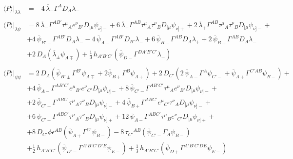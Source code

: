 \documentclass[a4paper,10pt,openany]{article}
\begin{document}
\begin{subequations}
	\begin{align}
		\langle P\rangle \bigg\vert_{\lambda\lambda}&=-4\,\overline{\lambda}_{-}\Gamma^{A}D_{A}\lambda_{-}\\
		\nonumber\\
		\langle P\rangle\bigg\vert_{\lambda\psi}&=8\,\overline{\lambda}_{-}\Gamma^{AB'}\tau^{\mu}{}_{A}e^{\nu}{}_{B'}D_{[\mu}\psi_{\nu ]-}
		+6\,\overline{\lambda}_{-}\Gamma^{AB}\tau^{\mu}{}_{A}\tau^{\nu}{}_{B}D_{[\mu}\psi_{\nu] +}+2\,\overline{\lambda}_{+}\Gamma^{AB}\tau^{\mu}{}_{A}\tau^{\nu}{}_{B}D_{[\mu}\psi_{\nu] -}+\nonumber\\
		&+4\,\overline{\psi}_{B'-}\Gamma^{AB'}D_{A}\lambda_{-}-4\,\overline{\psi}_{A-}\Gamma^{AB'}D_{B'}\lambda_{-}+6\,\overline{\psi}_{B-}\Gamma^{AB}D_{A}\lambda_{+}
		+2\,\overline{\psi}_{B+}\Gamma^{AB}D_{A}\lambda_{-}\nonumber\\
		&+2\,D_{A}(\overline{\lambda}_{\pm}\psi_{A\mp})+\frac{1}{3}\,h_{A'B'C'}(\overline{\psi}_{D-}\Gamma^{DA'B'C'}\lambda_{-})\\
		\nonumber\\
		\langle P\rangle\bigg\vert_{\psi\psi}&=2\,D_{A}(\overline{\psi}_{B'\pm}\Gamma^{B'}\psi_{A\mp}+2\overline{\psi}_{B+}\Gamma^{B}\psi_{A+})+2\,D_{C'}(2\,\overline{\psi}_{A-}\Gamma^{A}\psi_{C'-}+\overline{\psi}_{A+}\Gamma^{C'AB}\psi_{B-})+\nonumber\\
		&+4\,\overline{\psi}_{A-}\Gamma^{AB'C'}e^{\mu}{}_{B'}e^{\nu}{}_{C'}D_{[\mu}\psi_{\nu]-}+8\,\overline{\psi}_{C'-}\Gamma^{AB'C'}\tau^{\mu}{}_{A}e^{\nu}{}_{B'}D_{[\mu}\psi_{\nu]-}+\nonumber\\
		&+2\,\overline{\psi}_{C'+}\Gamma^{ABC'}\tau^{\mu}{}_{A}\tau^{\nu}{}_{B}D_{[\mu}\psi_{\nu]-}+4\,\overline{\psi}_{B+}\Gamma^{ABC'}e^{\mu}{}_{C'}\tau^{\nu}{}_{A}D_{[\mu}\psi_{\nu]-}+\nonumber\\
		&+6\,\overline{\psi}_{C'-}\Gamma^{ABC'}\tau^{\mu}{}_{A}\tau^{\nu}{}_{B}D_{[\mu}\psi_{\nu]+}+12\,\overline{\psi}_{A-}\Gamma^{ABC'}\tau^{\mu}{}_{B}e^{\nu}{}_{C'}D_{[\mu}\psi_{\nu]+}+\nonumber\\
		&+8\,D_{C'}\phi\epsilon^{AB}(\overline{\psi}_{A+}\Gamma^{C'}\psi_{B-})-8\,\tau_{C'}{}^{AB}(\overline{\psi}_{C'-}\Gamma_{A}\psi_{B-}) \nonumber\\
		&+\frac{1}{2}\,h_{A'B'C'}(\overline{\psi}_{D'-}\Gamma^{A'B'C'D'E}\psi_{E-})+\frac{1}{3}\,h_{A'B'C'}(\overline{\psi}_{D+}\Gamma^{A'B'C'DE}\psi_{E-})
	\end{align}
\end{subequations}
	
\end{document}

